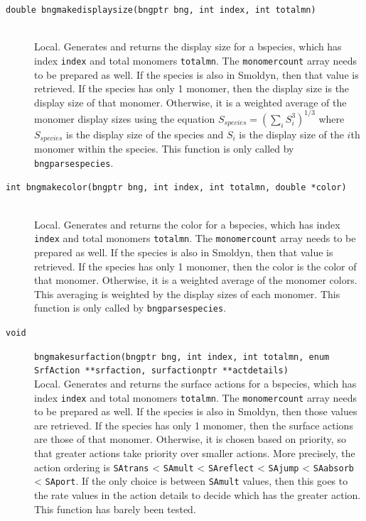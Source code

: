 \documentclass {scrbook}
\newcommand {\ttt} {\texttt}
\begin{document}
\begin{description}
\item[\ttt{double bngmakedisplaysize(bngptr bng, int index, int totalmn)}]
\hfill \\
Local. Generates and returns the display size for a bspecies, which has index \ttt{index} and total monomers \ttt{totalmn}. The \ttt{monomercount} array needs to be prepared as well. If the species is also in Smoldyn, then that value is retrieved. If the species has only 1 monomer, then the display size is the display size of that monomer. Otherwise, it is a weighted average of the monomer display sizes using the equation
$S_{species} = (\sum_{i} S_i^{3})^{1/3}$
where $S_{species}$ is the display size of the species and $S_i$ is the display size of the $i$th monomer within the species. This function is only called by \ttt{bngparsespecies}.

\item[\ttt{int bngmakecolor(bngptr bng, int index, int totalmn, double *color)}]
\hfill \\
Local. Generates and returns the color for a bspecies, which has index \ttt{index} and total monomers \ttt{totalmn}. The \ttt{monomercount} array needs to be prepared as well. If the species is also in Smoldyn, then that value is retrieved. If the species has only 1 monomer, then the color is the color of that monomer. Otherwise, it is a weighted average of the monomer colors. This averaging is weighted by the display sizes of each monomer. This function is only called by \ttt{bngparsespecies}.

\item[\ttt{void}]
\ttt{bngmakesurfaction(bngptr bng, int index, int totalmn, enum SrfAction **srfaction, surfactionptr **actdetails)}
\hfill \\
Local. Generates and returns the surface actions for a bspecies, which has index \ttt{index} and total monomers \ttt{totalmn}. The \ttt{monomercount} array needs to be prepared as well. If the species is also in Smoldyn, then those values are retrieved. If the species has only 1 monomer, then the surface actions are those of that monomer. Otherwise, it is chosen based on priority, so that greater actions take priority over smaller actions. More precisely, the action ordering is \ttt{SAtrans} < \ttt{SAmult} < \ttt{SAreflect} < \ttt{SAjump} < \ttt{SAabsorb} < \ttt{SAport}. If the only choice is between \ttt{SAmult} values, then this goes to the rate values in the action details to decide which has the greater action. This function has barely been tested.


\end{description}
\end{document}
